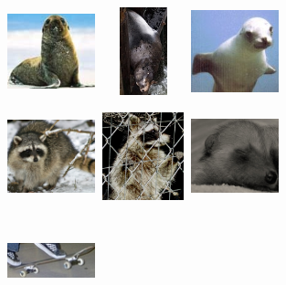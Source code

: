 \documentclass[10pt,twocolumn,letterpaper]{article}
\begin{document}
\begin{figure}[t]
\begin{center}
   \includegraphics[width=1.0in,height=1.0in]{sea_lion_1.jpg}
   \includegraphics[width=1.0in,height=1.0in]{sea_lion_2.jpg}
   \includegraphics[width=1.0in,height=1.0in]{sea_lion_3.jpg}
\end{center}
\begin{center}
   \includegraphics[width=1.0in,height=1.0in]{racoon_1.jpg}
   \includegraphics[width=1.0in,height=1.0in]{racoon_2.jpg}
   \includegraphics[width=1.0in,height=1.0in]{racoon_3.jpg}
\end{center}
\begin{center}
   \includegraphics[width=1.0in,height=1.0in]{skate_1.jpg}

\end{center}
\end{figure}
\end{document}

